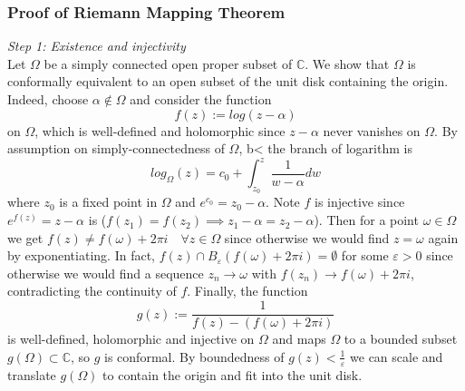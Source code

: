 \subsubsection{Proof of Riemann Mapping Theorem}
\textit{Step 1: Existence and injectivity} \\
Let $\Omega$ be a simply connected open proper subset of $\mathbb{C}$. We show that $\Omega$ is conformally equivalent to an open subset of the unit disk containing the origin. 
Indeed, choose $\alpha \notin \Omega$ and consider the function 
$$f(z) := log(z-\alpha)$$ 
on $\Omega$, which is well-defined and holomorphic since $z-\alpha$ never vanishes on $\Omega$. 
By assumption on simply-connectedness of $\Omega$, b< \cite[Theorem 6.2]{SteinShakarchi2003_complexanalysis} the branch of logarithm is 
$$log_{\Omega}(z) = c_0 + \int_{z_0}^{z} \frac{1}{w - \alpha} dw $$
where $z_0$ is a fixed point in $\Omega$ and $e^{c_0}=z_0-\alpha$.
Note $f$ is injective since $e^{f(z)} = z-\alpha$ is ($f(z_1) = f(z_2) \implies z_1 - \alpha = z_2 - \alpha$).
Then for a point $\omega \in \Omega$ we get $f(z) \neq f(\omega) + 2\pi i \quad\forall z \in \Omega$ since otherwise we would find $z = \omega$ again by exponentiating.
In fact, $f(z)\cap B_{\varepsilon}(f(\omega) + 2\pi i) = \emptyset$ for some $\varepsilon > 0$ since otherwise we would find a sequence $z_n \to \omega$ with $f(z_n) \to f(\omega) + 2\pi i$, contradicting the continuity of $f$.
Finally, the function $$g(z) := \frac{1}{f(z) - (f(\omega) + 2\pi i)}$$ is well-defined, holomorphic and injective on $\Omega$ and maps $\Omega$ to a bounded subset $g(\Omega)\subset\mathbb{C}$, so $g$ is conformal. 
By boundedness of $g(z) < \frac{1}{\varepsilon}$ we can scale and translate $g(\Omega)$ to contain the origin and fit into the unit disk.
\bigskip

